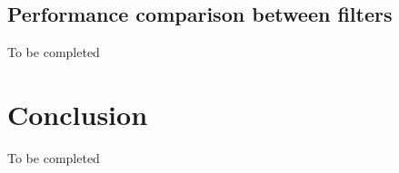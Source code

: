 \documentclass[10pt,letterpaper,final]{article}
\begin{document}
\subsection{Performance comparison between filters}
To be completed




\section{Conclusion}
\label{sec:conclusion}
To be completed
\end{document}
